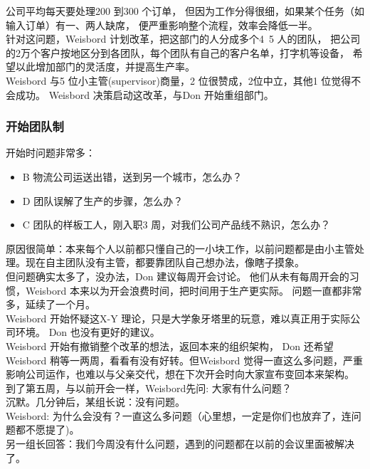公司平均每天要处理200 到300 个订单，
但因为工作分得很细，如果某个任务（如输入订单）有一、两人缺席，
便严重影响整个流程，效率会降低一半。\\
针对这问题，Weisbord 计划改革，把这部门的人分成多个4~5 人的团队，
把公司的2万个客户按地区分到各团队，每个团队有自己的客户名单，打字机等设备，
希望以此增加部门的灵活度，并提高生产率。\\
Weisbord 与5 位小主管(supervisor)商量，2 位很赞成，2位中立，其他1
位觉得不会成功。 Weisbord 决策启动这改革，与Don 开始重组部门。\\

\hypertarget{ux5f00ux59cbux56e2ux961fux5236}{%
\subsubsection{开始团队制}\label{ux5f00ux59cbux56e2ux961fux5236}}

开始时问题非常多：

\begin{itemize}
\tightlist
\item
  B 物流公司运送出错，送到另一个城市，怎么办？
\item
  D 团队误解了生产的步骤，怎么办？
\item
  C 团队的样板工人，刚入职3 周，对我们公司产品线不熟识，怎么办？
\end{itemize}

原因很简单：本来每个人以前都只懂自己的一小块工作，以前问题都是由小主管处理。现在自主团队没有主管，都要靠团队自己想办法，像瞎子摸象。\\
但问题确实太多了，没办法，Don 建议每周开会讨论。
他们从未有每周开会的习惯，Weisbord
本来以为开会浪费时间，把时间用于生产更实际。
问题一直都非常多，延续了一个月。\\
Weisbord 开始怀疑这X-Y
理论，只是大学象牙塔里的玩意，难以真正用于实际公司环境。 Don
也没有更好的建议。\\
Weisbord 开始有撤销整个改革的想法，返回本来的组织架构， Don
还希望Weisbord 稍等一两周，看看有没有好转。但Weisbord
觉得一直这么多问题，严重影响公司运作，也难以与父亲交代，想在下次开会时向大家宣布变回本来架构。\\
到了第五周，与以前开会一样，Weisbord先问: 大家有什么问题？\\
沉默。几分钟后，某组长说：没有问题。\\
Weisbord:
为什么会没有？一直这么多问题（心里想，一定是你们也放弃了，连问题都不愿提了)。\\
另一组长回答：我们今周没有什么问题，遇到的问题都在以前的会议里面被解决了。\\

